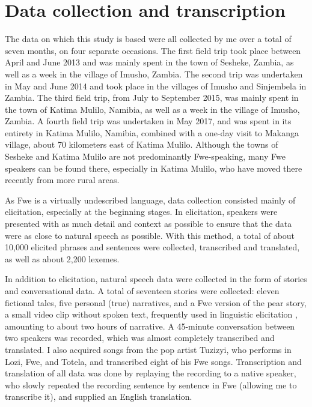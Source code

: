 \section{Data collection and transcription}
\label{bkm:Ref70697316}\hypertarget{Toc75352599}{}
The data on which this study is based were all collected by me over a total of seven months, on four separate occasions. The first field trip took place between April and June 2013 and was mainly spent in the town of Sesheke, Zambia, as well as a week in the village of Imusho, Zambia. The second trip was undertaken in May and June 2014 and took place in the villages of Imusho and Sinjembela in Zambia. The third field trip, from July to September 2015, was mainly spent in the town of Katima Mulilo, Namibia, as well as a week in the village of Imusho, Zambia. A fourth field trip was undertaken in May 2017, and was spent in its entirety in Katima Mulilo, Na\-mibia, combined with a one-day visit to Makanga village, about 70 kilometers east of Katima Mulilo. Although the towns of Sesheke and Katima Mulilo are not predominantly Fwe-speaking, many Fwe speakers can be found there, especially in Katima Mulilo, who have moved there re\-cently from more rural areas.

As Fwe is a virtually undescribed language, data collection consisted mainly of elicitation, espe\-cially at the beginning stages. In elicitation, speakers were presented with as much detail and con\-text as possible to ensure that the data were as close to natural speech as possible. With this method, a total of about 10,000 elicited phrases and sentences were collected, transcribed and translated, as well as about 2,200 lexemes.

In addition to elicitation, natural speech data were collected in the form of stories and conversa\-tional data. A total of seventeen stories were collected: eleven fictional tales, five personal (true) narra\-tives, and a Fwe version of the pear story, a small video clip without spoken text, frequently used in linguistic elicitation \citep{Chafe1980}, amounting to about two hours of narrative. A 45-minute conversation between two speakers was recorded, which was almost completely transcribed and translated. I also acquired songs from the pop artist Tuzizyi, who performs in Lozi, Fwe, and Totela, and tran\-scribed eight of his Fwe songs. Transcription and translation of all data was done by replaying the recording to a native speaker, who slowly repeated the recording sentence by sentence in Fwe (allowing me to transcribe it), and supplied an English translation.

